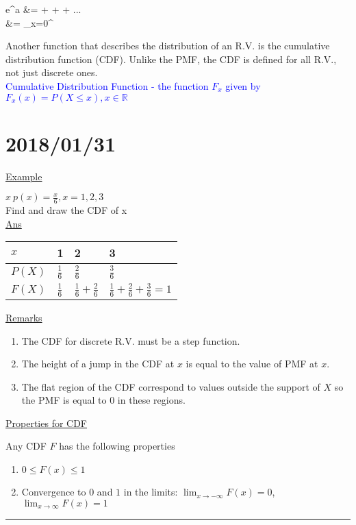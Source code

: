 \documentclass[12pt]{article}
\newcommand{\ddef}[1]{\textcolor{blue}{#1}}
\newcommand{\real}[0]{\mathbb{R}}
\newcommand{\divider}[0]{\textcolor{lightgray}{\rule{\textwidth}{0.1pt}}}
\newenvironment{example}{\shownto{-,notes}\underline{Example}\par}{\par\divider\endshownto}
\newenvironment{eqn}{\equation\alignedat{3}}{\endalignedat\endequation}
\begin{document}
\begin{eqn}
	e^a &=  +  +  + ... \\
	&= \sum_{x=0}^\infty {}
\end{eqn}

Another function that describes the distribution of an R.V. is the cumulative distribution function (CDF). Unlike the PMF, the CDF is defined for all R.V., not just discrete ones. \\

\ddef{Cumulative Distribution Function - the function $F_x$ given by $F_x(x) = P(X \le x), x \in \real$}

\section{2018/01/31}

\begin{example}
	$x ~ p(x) = \frac{x}{6}, x = 1, 2, 3$ \\
	Find and draw the CDF of x \\
	
	\underline{Ans} 
	
	\begin{tabular}[t]{@{} l | l | l | l}
		$x$ 	& 1 			& 2 			& 3 \\
		\hline
		$P(X)$	& $\frac{1}{6}$	& $\frac{2}{6}$	& $\frac{3}{6}$ \\
		\hline
		$F(X)$	& $\frac{1}{6}$	& $\frac{1}{6} + \frac{2}{6}$ & $\frac{1}{6} + \frac{2}{6} + \frac{3}{6} = 1$
	\end{tabular}

	\underline{Remarks}
	\begin{enumerate}
		\item The CDF for discrete R.V. must be a step function.
		\item The height of a jump in the CDF at $x$ is equal to the value of PMF at $x$.
		\item The flat region of the CDF correspond to values outside the support of $X$ so the PMF is equal to 0 in these regions.
	\end{enumerate}

	\underline{Properties for CDF}
	
	Any CDF $F$ has the following properties
	
	\begin{enumerate}
		\item $0 \le F(x) \le 1$
		\item Convergence to $0$ and $1$ in the limits:
		$\lim_{x \rightarrow -\infty} F(x) = 0$, $\lim_{x \rightarrow \infty} F(x) = 1$
		
		
	\end{enumerate}
\end{example}
\end{document}
